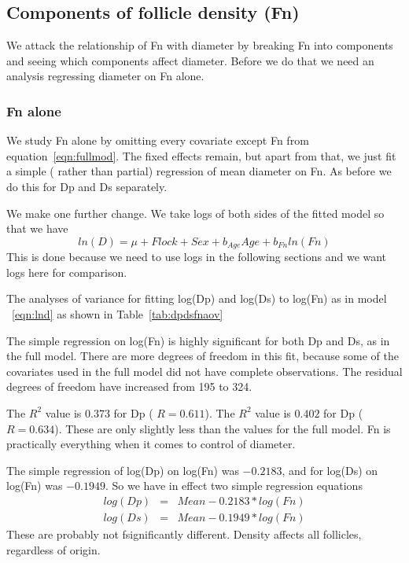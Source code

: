 \documentclass[titlepage]{article}  %
\begin{document}
\subsection{Components of follicle density (Fn)}
We attack the relationship of Fn with diameter by breaking Fn into components and seeing which components affect diameter. Before we do that we need an analysis regressing diameter on Fn alone.

\subsubsection{Fn alone}
We study Fn alone by omitting every covariate except Fn from equation~\ref{eqn:fullmod}. The fixed effects remain, but apart from that, we just fit a simple ( rather than partial) regression of mean diameter on Fn. As before we do this for Dp and Ds separately. 

We make one further change. We take logs of both sides of the fitted model so that we have
\begin{equation}
\label{eqn:lnd}
ln(D) = \mu + Flock + Sex + b_{Age} Age + b_{Fn} ln(Fn)
\end{equation}
This is done because we need to use logs in the following sections and we want logs here for comparison.

The analyses of variance for fitting log(Dp) and log(Ds) to log(Fn) as in model ~\ref{eqn:lnd} as shown in Table~\ref{tab:dpdsfnaov}

The  simple regression on log(Fn) is highly significant for both Dp and Ds, as in the full model. There are more degrees of freedom in this fit, because some of the covariates used in the full model did not have complete observations. The residual degrees of freedom have increased from 195 to 324. 

The $R^{2}$ value is $0.373$ for Dp ( $R = 0.611$). The $R^{2}$ value is $0.402$ for Dp ( $R = 0.634$). These are only slightly less than the values for the full model. Fn is practically everything when it comes to control of diameter.

The simple regression of log(Dp) on log(Fn) was $-0.2183$, and for log(Ds) on log(Fn) was $-0.1949$. So we have in effect two simple regression equations
\begin{eqnarray}
log(Dp) & = & Mean - 0.2183 * log(Fn) \\
log(Ds) & = & Mean - 0.1949 * log(Fn) 
\end{eqnarray}
These are probably not fsignificantly different. Density affects all follicles, regardless of origin.
\end{document}
